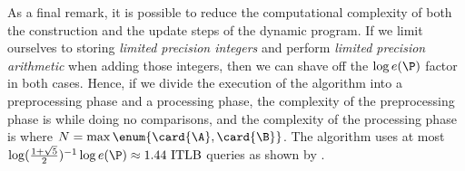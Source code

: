 
As a final remark, it is possible to reduce the computational
complexity of both the construction and the update steps of the dynamic program. If
we limit ourselves to storing \emph{limited precision integers} and perform
\emph{limited precision arithmetic} when adding those integers, then we can
shave off the \(\log e(\P)\) factor in both cases. Hence, if we divide the
execution of the algorithm into a preprocessing phase and a processing phase,
the complexity of the preprocessing phase is \BigO{\card{\A}\card{\B}} while doing no
comparisons, and the complexity of the processing phase is 
where \(N = \max \enum{\card{\A},\card{\B}}\). The algorithm uses at most
\(\log(\frac{1+\sqrt{5}}{2})^{-1} \log e(\P) \approx 1.44 \text{ ITLB}\)
queries as shown by \citet*{linial:1984}.
